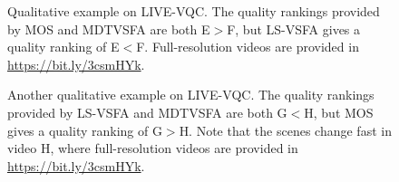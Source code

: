 \documentclass[twocolumn]{svjour3}          \smartqed  \usepackage{graphicx}
\begin{document}
\begin{figure}[!htb]
\begin{center}
\hfill  
\hfill
\end{center}
  \caption{Qualitative example on LIVE-VQC. The quality rankings provided by MOS and MDTVSFA are both E$>$F, but LS-VSFA gives a quality ranking of E$<$F. Full-resolution videos are provided in \url{https://bit.ly/3csmHYk}.} 
 \label{fig:examples2}
\end{figure}

\begin{figure}[!htb]
\begin{center} 
\hfill  
\hfill
\end{center}
  \caption{Another qualitative example on LIVE-VQC. The quality rankings provided by LS-VSFA and MDTVSFA are both G$<$H, but MOS gives a quality ranking of G$>$H. Note that the scenes change fast in video H, where full-resolution videos are provided in \url{https://bit.ly/3csmHYk}.} 
 \label{fig:examples3}
\end{figure}
\end{document}
